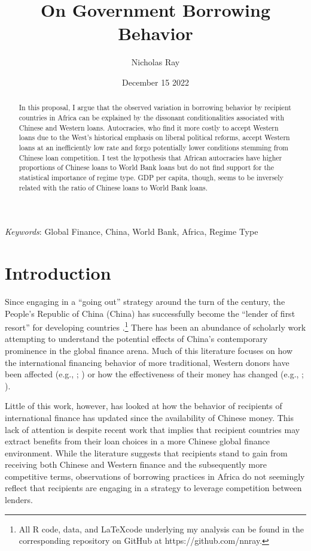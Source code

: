 \documentclass[12pt]{article}
\title{\vspace{-2.75cm}On Government Borrowing Behavior\vspace{-0.5cm}}
\author{Nicholas Ray}
\date{\vspace{-0.30cm}December 15 2022\vspace{-1cm}}
\begin{document}
\maketitle
\begin{abstract}
    In this proposal, I argue that the observed variation in borrowing behavior by recipient countries in Africa can be explained by the dissonant conditionalities associated with Chinese and Western loans. Autocracies, who find it more costly to accept Western loans due to the West's historical emphasis on liberal political reforms, accept Western loans at an inefficiently low rate and forgo potentially lower conditions stemming from Chinese loan competition. I test the hypothesis that African autocracies have higher proportions of Chinese loans to World Bank loans but do not find support for the statistical importance of regime type. GDP per capita, though, seems to be inversely related with the ratio of Chinese loans to World Bank loans.  
\end{abstract}
\vspace{0.5cm}
\textit{Keywords}: Global Finance, China, World Bank, Africa, Regime Type

\section*{Introduction}
Since engaging in a ``going out'' strategy around the turn of the century, the People's Republic of China (China) has successfully become the ``lender of first resort'' for developing countries \parencite[1]{dreher2022}.\footnote{All R code, data, and \LaTeX \;code underlying my analysis can be found in the corresponding repository on GitHub at https://github.com/nnray.} There has been an abundance of scholarly work attempting to understand the potential effects of China's contemporary prominence in the global finance arena. Much of this literature focuses on how the international financing behavior of more traditional, Western donors have been affected (e.g., \cite{humphrey2019}; \cite{kilama2016a}) or how the effectiveness of their money has changed (e.g., \cite{blair2022}; \cite{gehring2022}).

Little of this work, however, has looked at how the behavior of recipients of international finance has updated since the availability of Chinese money. This lack of attention is despite recent work that implies that recipient countries may extract benefits from their loan choices in a more Chinese global finance environment. While the literature suggests that recipients stand to gain from receiving both Chinese and Western finance and the subsequently more competitive terms, observations of borrowing practices in Africa do not seemingly reflect that recipients are engaging in a strategy to leverage competition between lenders.
\end{document}
